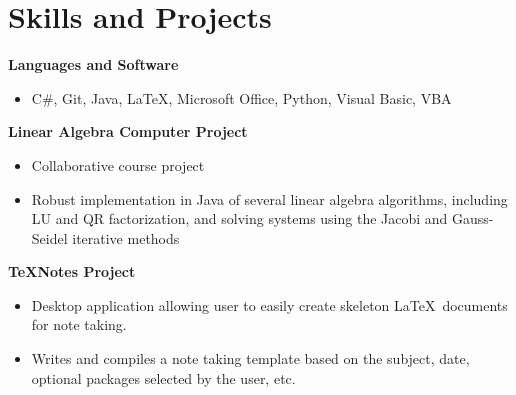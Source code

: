 \documentclass[11pt]{article}
\begin{document}
\section*{Skills and Projects}
\textbf{Languages and Software}
\begin{itemize}
\setlength\itemsep{0.5pt}
    \item C\#, Git, Java, \LaTeX, Microsoft Office, Python, Visual Basic, VBA
\end{itemize}

\textbf{Linear Algebra Computer Project}
\begin{itemize}
\setlength\itemsep{0.5pt}
    \item Collaborative course project
    \item Robust implementation in Java of several linear algebra algorithms, including LU and QR factorization, and solving systems using the Jacobi and Gauss-Seidel iterative methods
\end{itemize}

\textbf{TeXNotes Project}
\begin{itemize}
\setlength\itemsep{0.5pt}
    \item Desktop application allowing user to easily create skeleton \LaTeX\ documents for note taking.
    \item Writes and compiles a note taking template based on the subject, date, optional packages selected by the user, etc. 
\end{itemize}
\end{document}
